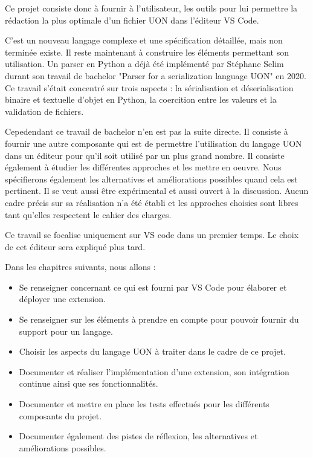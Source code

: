 \documentclass[
    iict, %
    il, %
]{heig-tb}
\begin{document}
Ce projet consiste donc à fournir à l'utilisateur, les outils pour lui permettre la rédaction la plus optimale d'un fichier UON dans l'éditeur VS Code.

C'est un nouveau langage complexe et une spécification détaillée, mais non terminée existe. Il reste maintenant à construire les éléments permettant son utilisation.
Un parser en Python a déjà été implémenté par Stéphane Selim durant son travail de bachelor "Parser for a serialization language UON" en 2020.
Ce travail s'était concentré sur trois aspects : la sérialisation et déserialisation binaire et textuelle d'objet en Python, la coercition entre les valeurs et la validation de fichiers.

Cepedendant ce travail de bachelor n'en est pas la suite directe.
Il consiste à fournir une autre composante qui est de permettre l'utilisation du langage UON dans un éditeur pour qu'il soit utilisé par un plus grand nombre.
Il consiste également à étudier les différentes approches et les mettre en oeuvre. Nous spécifierons également les alternatives et améliorations possibles quand cela est pertinent.
Il se veut aussi être expérimental et aussi ouvert à la discussion.
Aucun cadre précis sur sa réalisation n'a été établi et les approches choisies sont libres tant qu'elles respectent le cahier des charges.

Ce travail se focalise uniquement sur VS code dans un premier temps. Le choix de cet éditeur sera expliqué plus tard.

Dans les chapitres suivants, nous allons :

\begin{itemize}
    \item Se renseigner concernant ce qui est fourni par VS Code pour élaborer et déployer une extension.
    \item Se renseigner sur les éléments à prendre en compte pour pouvoir fournir du support pour un langage.
    \item Choisir les aspects du langage UON à traiter dans le cadre de ce projet.
    \item Documenter et réaliser l'implémentation d'une extension, son intégration continue ainsi que ses fonctionnalités.
    \item Documenter et mettre en place les tests effectués pour les différents composants du projet.
    \item Documenter également des pistes de réflexion, les alternatives et améliorations possibles.
\end{itemize}
\end{document}
